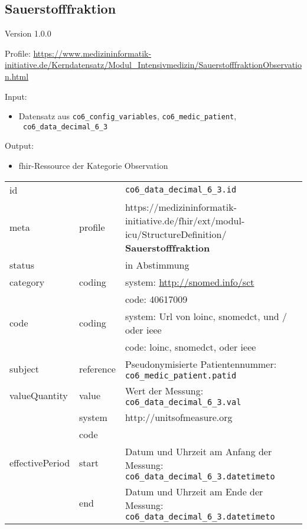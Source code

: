 \subsection{Sauerstofffraktion} 
\noindent Version 1.0.0

\noindent Profile: \url{https://www.medizininformatik-initiative.de/Kerndatensatz/Modul_Intensivmedizin/SauerstofffraktionObservation.html}

\noindent Input:
\begin{itemize}
	\item Datensatz aus \texttt{co6\_config\_variables}, \texttt{co6\_medic\_patient}, \\ \texttt{
co6\_data\_decimal\_6\_3}
\end{itemize}
Output:
\begin{itemize}
        \item \ac{fhir}-Ressource der Kategorie \glqq Observation\grqq{}
\end{itemize}
\begin{longtable}{|l|l|p{7.5cm}|}
        \hline
        \rowcolor{lightgray} \multicolumn{3}{|l|}{Data Mapping (inhaltlich)} \\ \hline
        id &  & \texttt{co6\_data\_decimal\_6\_3.id} \\ \hline
	meta & profile & https://medizininformatik-initiative.de/fhir/ext/modul-icu/StructureDefinition/\textbf{
Sauerstofffraktion} \\ \hline 
	status &  & in Abstimmung  \\ \hline 
	category & coding & system: \url{http://snomed.info/sct} \\
\cline{3-3}
	& & code: 40617009 \\ \hline
	code & coding & system: Url von \ac{loinc}, \ac{snomedct}, und / oder \ac{ieee} \\ 
	\cline{3-3} 
	 &  & code: \ac{loinc}, \ac{snomedct}, oder \ac{ieee} \\ \hline
	subject & reference & Pseudonymisierte Patientennummer: \texttt{co6\_medic\_patient.patid} \\ \hline
	valueQuantity & value & Wert der Messung: \texttt{
co6\_data\_decimal\_6\_3.val} \\
        \cline{2-3}
         & system & http://unitsofmeasure.org \\
         \cline{2-3}
         & code & \\ \hline
    effectivePeriod & start & Datum und Uhrzeit am Anfang der Messung: \texttt{co6\_data\_decimal\_6\_3.datetimeto} \\
    \cline{2-3}
     & end & Datum und Uhrzeit am Ende der Messung: \texttt{co6\_data\_decimal\_6\_3.datetimeto} \\ \hline
\end{longtable}


